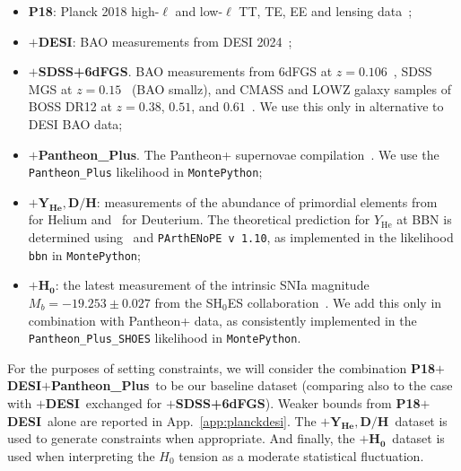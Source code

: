 \documentclass[aps,prd,twocolumn,notitlepage,
superscriptaddress,
nofootinbib,floatfix]{revtex4-2}
\newcommand{\planck}{\textbf{P18}}
\newcommand{\desi}{$\mathbf{+}$\textbf{DESI}}
\newcommand{\boss}{$\mathbf{+}$\textbf{SDSS+6dFGS}}
\newcommand{\pantheon}{$\mathbf{+}${\bf Pantheon\_Plus}}
\newcommand{\bbnlike}{$\mathbf{+ Y_\text{He}, D/H}$}
\newcommand{\shoes}{$\mathbf{+ H_0}$}
\begin{document}
\begin{itemize}
\item{\planck: Planck 2018 high-$\ell$ and low-$\ell$ TT, TE, EE and lensing data~\cite{Planck:2019nip}};

\item{\desi: BAO measurements from DESI 2024~\cite{DESI:2024mwx}; }

\item{\boss. BAO measurements from 6dFGS at $z = 0.106$~\cite{Beutler:2011hx}, SDSS MGS at $z = 0.15$~\cite{Ross:2014qpa} (BAO smallz), and CMASS and LOWZ galaxy samples of BOSS DR12 at $z = 0.38$, $0.51$, and $0.61$~\cite{BOSS:2016wmc}. We use this only in alternative to DESI BAO data;}

\item{\pantheon. The Pantheon+ supernovae compilation~\cite{Scolnic:2021amr}. We use the {\tt Pantheon\_Plus} likelihood in {\tt MontePython};}

\item{\bbnlike: measurements of the abundance of primordial elements from~\cite{Aver:2015iza} for Helium and~\cite{Cooke:2017cwo} for Deuterium. The theoretical prediction for $Y_\text{He}$ at BBN is determined using~\cite{Marcucci:2015yla} and {\tt PArthENoPE v 1.10}, as implemented in the likelihood {\tt bbn} in {\tt MontePython};}


\item{\shoes: the latest measurement of the intrinsic SNIa magnitude $M_b=-19.253\pm0.027$ from the SH$_{0}$ES collaboration~\cite{Riess:2021jrx}. We add this only in combination with Pantheon+ data, as consistently implemented in the {\tt Pantheon\_Plus\_SHOES} likelihood in {\tt MontePython}.}

\end{itemize}

For the purposes of setting constraints, we will consider the combination \planck\desi\pantheon\, to be our baseline dataset (comparing also to the case with \desi\, exchanged for \boss). Weaker bounds from \planck\desi\, alone are reported in App.~\ref{app:planckdesi}. The \bbnlike\, dataset is used to generate constraints when appropriate. And finally, the \shoes\, dataset is used when interpreting the $H_0$ tension as a moderate statistical fluctuation.







\end{document}

